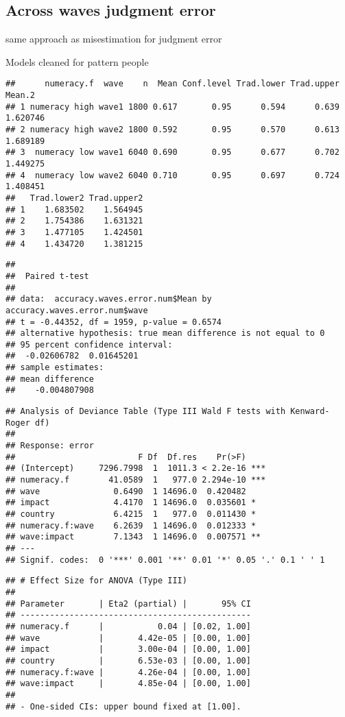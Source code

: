 \documentclass[
]{article}
\begin{document}
\hypertarget{across-waves-judgment-error}{%
\subsection{Across waves judgment
error}\label{across-waves-judgment-error}}

same approach as misestimation for judgment error

Models cleaned for pattern people

\begin{verbatim}
##      numeracy.f  wave    n  Mean Conf.level Trad.lower Trad.upper   Mean.2
## 1 numeracy high wave1 1800 0.617       0.95      0.594      0.639 1.620746
## 2 numeracy high wave2 1800 0.592       0.95      0.570      0.613 1.689189
## 3  numeracy low wave1 6040 0.690       0.95      0.677      0.702 1.449275
## 4  numeracy low wave2 6040 0.710       0.95      0.697      0.724 1.408451
##   Trad.lower2 Trad.upper2
## 1    1.683502    1.564945
## 2    1.754386    1.631321
## 3    1.477105    1.424501
## 4    1.434720    1.381215
\end{verbatim}

\begin{verbatim}
## 
##  Paired t-test
## 
## data:  accuracy.waves.error.num$Mean by accuracy.waves.error.num$wave
## t = -0.44352, df = 1959, p-value = 0.6574
## alternative hypothesis: true mean difference is not equal to 0
## 95 percent confidence interval:
##  -0.02606782  0.01645201
## sample estimates:
## mean difference 
##    -0.004807908
\end{verbatim}

\begin{verbatim}
## Analysis of Deviance Table (Type III Wald F tests with Kenward-Roger df)
## 
## Response: error
##                         F Df  Df.res    Pr(>F)    
## (Intercept)     7296.7998  1  1011.3 < 2.2e-16 ***
## numeracy.f        41.0589  1   977.0 2.294e-10 ***
## wave               0.6490  1 14696.0  0.420482    
## impact             4.4170  1 14696.0  0.035601 *  
## country            6.4215  1   977.0  0.011430 *  
## numeracy.f:wave    6.2639  1 14696.0  0.012333 *  
## wave:impact        7.1343  1 14696.0  0.007571 ** 
## ---
## Signif. codes:  0 '***' 0.001 '**' 0.01 '*' 0.05 '.' 0.1 ' ' 1
\end{verbatim}

\begin{verbatim}
## # Effect Size for ANOVA (Type III)
## 
## Parameter       | Eta2 (partial) |       95% CI
## -----------------------------------------------
## numeracy.f      |           0.04 | [0.02, 1.00]
## wave            |       4.42e-05 | [0.00, 1.00]
## impact          |       3.00e-04 | [0.00, 1.00]
## country         |       6.53e-03 | [0.00, 1.00]
## numeracy.f:wave |       4.26e-04 | [0.00, 1.00]
## wave:impact     |       4.85e-04 | [0.00, 1.00]
## 
## - One-sided CIs: upper bound fixed at [1.00].
\end{verbatim}
\end{document}
